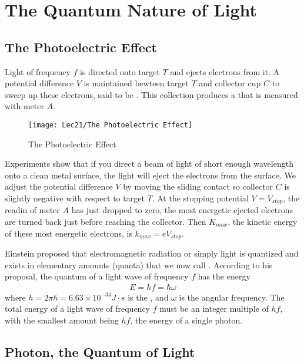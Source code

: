 \newpage
\section{The Quantum Nature of Light}


\subsection{The Photoelectric Effect}
Light of frequency $f$ is directed onto target $T$ and ejects electrons from it. A potential difference $V$ is maintained bewteen target $T$ and collector cup $C$ to sweep up these electrons, said to be . This collection produces a  that is measured with meter $A$. 

\begin{figure}[H]
    \centering
    \texttt{[image: Lec21/The Photoelectric Effect]}
    \caption{The Photoelectric Effect}
\end{figure}

Experiments show that if you direct a beam of light of short enough wavelength onto a clean metal surface, the light will eject the electrons from the surface. We adjust the potential difference $V$ by moving the sliding contact so collector $C$ is slightly negative with respect to target $T$. At the stopping potential $V=V_{stop}$, the readin of meter $A$ has just dropped to zero, the most energetic ejected electrons are turned back just before reaching the collector. Then $K_{max}$, the kinetic energy of these most energetic electrons, is $k_{max}=eV_{stop}$. 

Einstein proposed that electromagnetic radiation or simply light is quantized and exists in elementary amounts (quanta) that we now call . According to his proposal, the quantum of a light wave of frequency $f$ has the energy
\begin{align*}
    E=hf=\hbar \omega
\end{align*}
where $h=2\pi \hbar=6.63\times 10^{-34} J\cdot s$ is the , and $\omega$ is the angular frequency. The total energy of a light wave of frequency $f$ must be an integer multiple of $hf$, with the smallest amount being $hf$, the energy of a single photon.  

\subsection{Photon, the Quantum of Light}

